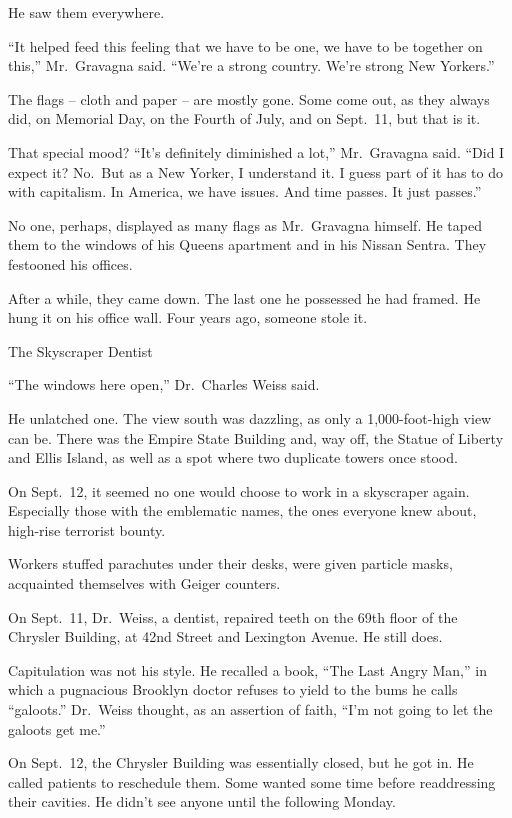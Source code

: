 ﻿\documentclass[12pt]{article}
\begin{document}
He saw them everywhere.

``It helped feed this feeling that we have to be one, we have to be together on this,'' Mr.~Gravagna
said. ``We're a strong country. We're strong New Yorkers.''

The flags -- cloth and paper -- are mostly gone. Some come out, as they always did, on Memorial Day,
on the Fourth of July, and on Sept.~11, but that is it.

That special mood? ``It's definitely diminished a lot,'' Mr.~Gravagna said. ``Did I expect it?
No.~But as a New Yorker, I understand it. I guess part of it has to do with capitalism. In America,
we have issues. And time passes. It just passes.''

No one, perhaps, displayed as many flags as Mr.~Gravagna himself. He taped them to the windows of
his Queens apartment and in his Nissan Sentra. They festooned his offices.

After a while, they came down. The last one he possessed he had framed. He hung it on his office
wall. Four years ago, someone stole it.

The Skyscraper Dentist

``The windows here open,'' Dr.~Charles Weiss said.

He unlatched one. The view south was dazzling, as only a 1,000-foot-high view can be. There was the
Empire State Building and, way off, the Statue of Liberty and Ellis Island, as well as a spot where
two duplicate towers once stood.

On Sept.~12, it seemed no one would choose to work in a skyscraper again. Especially those with the
emblematic names, the ones everyone knew about, high-rise terrorist bounty.

Workers stuffed parachutes under their desks, were given particle masks, acquainted themselves with
Geiger counters.

On Sept.~11, Dr.~Weiss, a dentist, repaired teeth on the 69th floor of the Chrysler Building, at
42nd Street and Lexington Avenue. He still does.

Capitulation was not his style. He recalled a book, ``The Last Angry Man,'' in which a pugnacious
Brooklyn doctor refuses to yield to the bums he calls ``galoots.'' Dr.~Weiss thought, as an
assertion of faith, ``I'm not going to let the galoots get me.''

On Sept.~12, the Chrysler Building was essentially closed, but he got in. He called patients to
reschedule them. Some wanted some time before readdressing their cavities. He didn't see anyone
until the following Monday.
\end{document}
